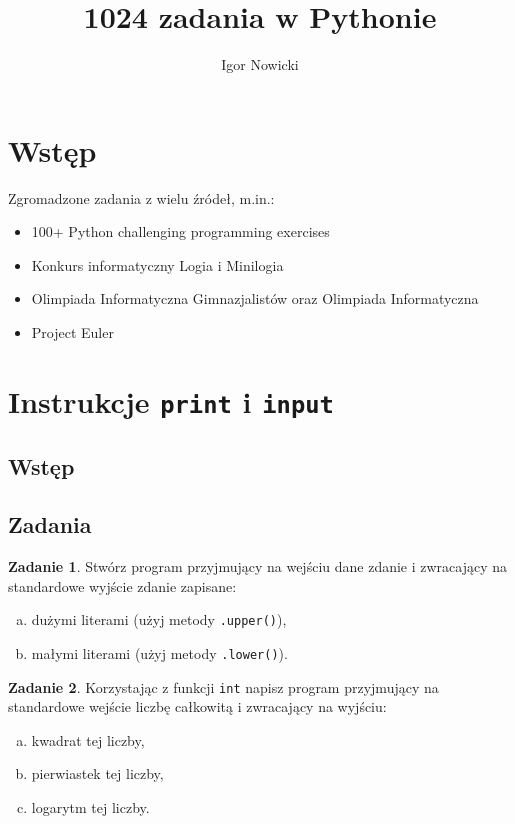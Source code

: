 \documentclass[11pt]{article}
\title{1024 zadania w Pythonie}
\author{Igor Nowicki}
\theoremstyle{definition}
\newtheorem{zadanie}{Zadanie}
\begin{document}
\maketitle
\tableofcontents
\section{Wstęp}
Zgromadzone zadania z wielu źródeł, m.in.:
\begin{itemize}
\item 100+ Python challenging programming exercises
\item Konkurs informatyczny Logia i Minilogia
\item Olimpiada Informatyczna Gimnazjalistów oraz Olimpiada Informatyczna
\item Project Euler
\end{itemize}
\section{Instrukcje \texttt{print} i \texttt{input}}
\subsection{Wstęp}
\subsection{Zadania}
\begin{zadanie}
Stwórz program przyjmujący na wejściu dane zdanie i zwracający na standardowe wyjście zdanie zapisane:
\begin{enumerate}[a)]
\item dużymi literami (użyj metody \texttt{.upper()}),
\item małymi literami (użyj metody \texttt{.lower()}).
\end{enumerate}
\end{zadanie}

\begin{zadanie}
Korzystając z funkcji \texttt{int} napisz program przyjmujący na standardowe wejście liczbę całkowitą i zwracający na wyjściu:
\begin{enumerate}[a)]
\item kwadrat tej liczby,
\item pierwiastek tej liczby,
\item logarytm tej liczby.
\end{enumerate}
\end{zadanie}
\end{document}
